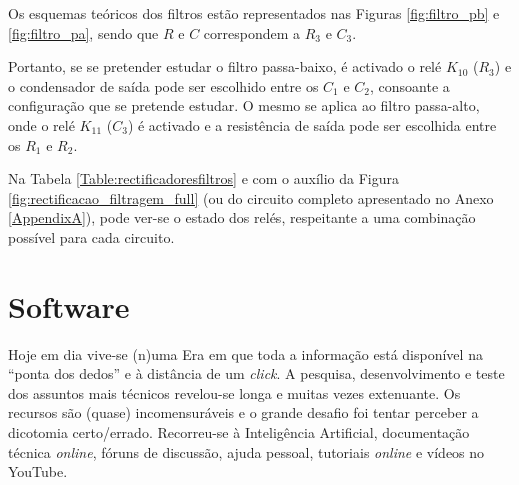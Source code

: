 Os esquemas teóricos dos filtros estão representados nas Figuras \ref{fig:filtro_pb} e \ref{fig:filtro_pa}, sendo que $R$ e $C$  correspondem a $R_{3}$ e $C_{3}$.

Portanto, se se pretender estudar o filtro passa-baixo, é activado o relé $K_{10}$ ($R_{3}$) e o condensador de saída pode ser escolhido entre os $C_{1}$ e $C_{2}$, consoante a configuração que se pretende estudar. O mesmo se aplica ao filtro passa-alto, onde o relé $K_{11}$ ($C_{3}$) é activado e a resistência de saída pode ser escolhida entre os $R_{1}$ e $R_{2}$. 

Na Tabela \ref{Table:rectificadoresfiltros} e com o auxílio da Figura \ref{fig:rectificacao_filtragem_full} (ou do circuito completo apresentado no Anexo \ref{AppendixA}), pode ver-se o estado dos relés, respeitante a uma combinação possível para cada circuito. 

\begin{table}[htb]
	\centering
	\caption{Exemplo funcionamento do rectificador de meia onda} 
	\label{Table:rectificadoresfiltros}
\end{table}

\section{Software}
\label{sec:implementacaosoftware}
Hoje em dia vive-se (n)uma Era em que toda a informação está disponível na ``ponta dos dedos'' e à distância de um \textit{click}. A pesquisa, desenvolvimento e teste dos assuntos mais técnicos revelou-se longa e muitas vezes extenuante. Os recursos são (quase) incomensuráveis e o grande desafio foi tentar perceber a dicotomia certo/errado. Recorreu-se à Inteligência Artificial, documentação técnica \textit{online}, fóruns de discussão, ajuda pessoal, tutoriais \textit{online} e vídeos no YouTube.

